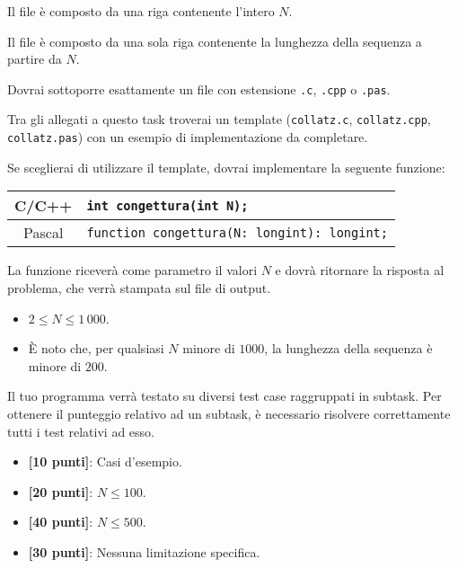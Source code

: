 \InputFile
Il file  è composto da una riga contenente l'intero $N$.

\OutputFile
Il file \outputfile{} è composto da una sola riga contenente la lunghezza della sequenza a partire da $N$.

\Implementation
Dovrai sottoporre esattamente un file con estensione \texttt{.c}, \texttt{.cpp} o \texttt{.pas}.

\begin{warning}
Tra gli allegati a questo task troverai un template (\texttt{collatz.c}, \texttt{collatz.cpp}, \texttt{collatz.pas}) con un esempio di implementazione da completare.
\end{warning}

Se sceglierai di utilizzare il template, dovrai implementare la seguente funzione:
\begin{center}\begin{tabularx}{\textwidth}{|c|X|}
\hline
C/C++  & \verb|int congettura(int N);|\\
\hline
Pascal & \verb|function congettura(N: longint): longint;|\\
\hline
\end{tabularx}\end{center}
La funzione riceverà come parametro il valori $N$ e dovrà ritornare la risposta al problema, che verrà stampata sul file di output.

\pagebreak
\Constraints
\begin{itemize}[nolistsep, itemsep=2mm]
\item $2 \le N \le 1\,000 $.
\item È noto che, per qualsiasi $N$ minore di $1000$, la lunghezza della sequenza è minore di $200$.
\end{itemize}

\Scoring
Il tuo programma verrà testato su diversi test case raggruppati in subtask.
Per ottenere il punteggio relativo ad un subtask, è necessario risolvere
correttamente tutti i test relativi ad esso.

\begin{itemize}[nolistsep,itemsep=2mm]
  \item \textbf{ [10 punti]}: Casi d'esempio.
  \item \textbf{ [20 punti]}: $N \le 100$.
  \item \textbf{ [40 punti]}: $N \le 500$.
  \item \textbf{ [30 punti]}: Nessuna limitazione specifica.
\end{itemize}

\Examples
\begin{example}
\end{example}
\begin{example}
\end{example}